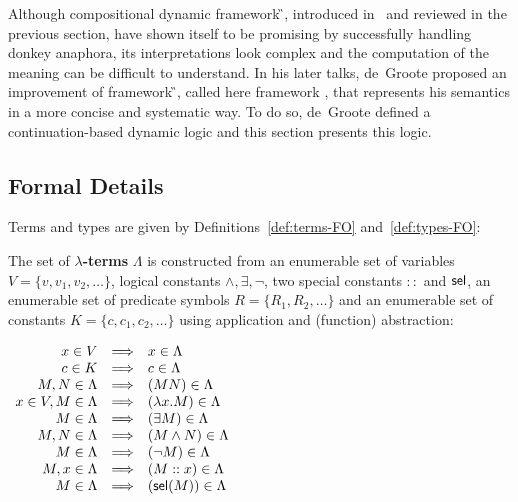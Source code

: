 Although compositional dynamic framework {\G}, introduced in~\cite{deGroote:2006:Towards-a-Montagovian-Account-of-Dynamics} and reviewed in the previous section, have shown itself to be promising by successfully handling donkey anaphora, its interpretations look complex and the computation of the meaning can be difficult to understand. In his later talks, de~Groote proposed an improvement of framework {\G}, called here framework {\GN}, that represents his semantics in a more concise and systematic way. To do so, de~Groote defined a continuation-based dynamic logic and this section presents this logic.

\subsection{Formal Details}

Terms and types are given by Definitions~\ref{def:terms-FO} and~\ref{def:types-FO}:
\begin{definition}\label{def:FO-lambda-terms}
 The set of \textbf{$\lambda$-terms} $\Lambda$ is constructed from an enumerable set of variables $V = \{ v, v_1, v_2, \dots \}$, logical constants $\land, \exists, \neg$, two special constants $::$ and $\mathsf{sel}$, an enumerable set of predicate symbols $R = \{ R_1, R_2, \dots  \}$ and an enumerable set of constants $K = \{ c, c_1, c_2, \dots \}$  using application and (function) abstraction:
\begin{center}
$
\begin{array}{rcl}
x \in V & \Longrightarrow & x \in \Lambda\\
c \in K & \Longrightarrow & c \in \Lambda\\
M,N \in \Lambda &  \Longrightarrow & (MN) \in \Lambda\\ 
 x \in V, M \in \Lambda&  \Longrightarrow  & (\lambda x.M) \in \Lambda \\
  M \in \Lambda&  \Longrightarrow  & (\exists M) \in \Lambda\\ 
M,N \in \Lambda &  \Longrightarrow  & (M \land N) \in \Lambda \\
M \in \Lambda &  \Longrightarrow  & (\neg M)  \in \Lambda \\
M,x \in \Lambda &  \Longrightarrow  & (M::x) \in \Lambda\\
M \in \Lambda &  \Longrightarrow  & (\mathsf{sel}(M))  \in \Lambda
\end{array} 
$
\end{center}
\label{def:terms-FO}
\end{definition}


